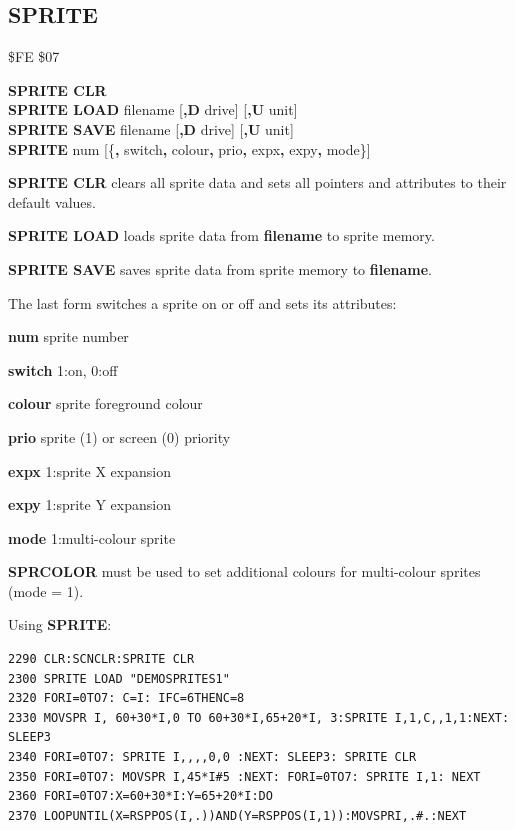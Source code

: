 \subsection{SPRITE}
\begin{description}[leftmargin=2cm,style=nextline]
\item [Token:] \$FE \$07
\item [Format:] {\bf SPRITE CLR} \\
                {\bf SPRITE LOAD} filename [{\bf,D} drive] [{\bf,U} unit] \\
                {\bf SPRITE SAVE} filename [{\bf,D} drive] [{\bf,U} unit] \\
                {\bf SPRITE} num [\{{\bf,} switch{\bf,} colour{\bf,}
		prio{\bf,} expx{\bf,} expy{\bf,} mode\}]
\item [Usage:]  {\bf SPRITE CLR} clears all sprite data and sets all pointers
                and attributes to their default values.

                {\bf SPRITE LOAD } loads sprite data from {\bf filename}
                to sprite memory.

                {\bf SPRITE SAVE } saves sprite data from
                sprite memory to {\bf filename}.

                \filenamedefinition

                The last form switches a sprite on or off and sets its attributes:

                {\bf num} sprite number

                {\bf switch} 1:on, 0:off

                {\bf colour} sprite foreground colour

                {\bf prio} sprite (1) or screen (0) priority

                {\bf expx} 1:sprite X expansion

                {\bf expy} 1:sprite Y expansion

                {\bf mode} 1:multi-colour sprite

\item [Remarks:] {\bf SPRCOLOR} must be used to set
                additional colours
                for multi-colour sprites (mode = 1).

\item [Example:] Using {\bf SPRITE}:
\begin{tcolorbox}[colback=black,coltext=white]
\verbatimfont{\codefont}
\begin{verbatim}
2290 CLR:SCNCLR:SPRITE CLR
2300 SPRITE LOAD "DEMOSPRITES1"
2320 FORI=0TO7: C=I: IFC=6THENC=8
2330 MOVSPR I, 60+30*I,0 TO 60+30*I,65+20*I, 3:SPRITE I,1,C,,1,1:NEXT: SLEEP3
2340 FORI=0TO7: SPRITE I,,,,0,0 :NEXT: SLEEP3: SPRITE CLR
2350 FORI=0TO7: MOVSPR I,45*I#5 :NEXT: FORI=0TO7: SPRITE I,1: NEXT
2360 FORI=0TO7:X=60+30*I:Y=65+20*I:DO
2370 LOOPUNTIL(X=RSPPOS(I,.))AND(Y=RSPPOS(I,1)):MOVSPRI,.#.:NEXT
\end{verbatim}
\end{tcolorbox}
\end{description}

